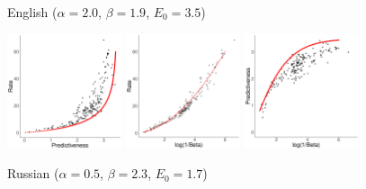 \documentclass[11pt,letterpaper]{article}
\begin{document}
\begin{figure}
	\begin{center}
		English {\tiny{($\alpha=2.0$, $\beta=1.9$, $E_0=3.5$)}}


\includegraphics[width=0.3\textwidth]{code/figures/en-words-info-fitted.pdf}
\includegraphics[width=0.3\textwidth]{code/figures/en-words-nlogbeta-mem-fitted.pdf}
\includegraphics[width=0.3\textwidth]{code/figures/en-words-nlogbeta-ee-fitted.pdf}

		Russian {\tiny ($\alpha=0.5$, $\beta=2.3$, $E_0=1.7$)}



\end{center}
\end{figure}
\end{document}
